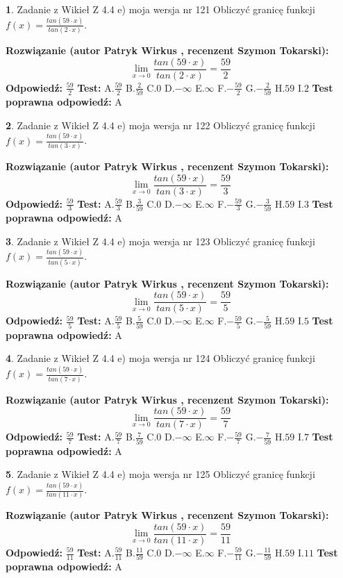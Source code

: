 \documentclass[12pt, a4paper]{article}
\theoremstyle{definition} %
\newtheorem{zad}{}
\newcommand{\zadStart}[1]{\begin{zad}#1\newline}
\newcommand{\zadStop}{\end{zad}}
\newcommand{\rozwStart}[2]{\noindent \textbf{Rozwiązanie (autor #1 , recenzent #2): }\newline}
\newcommand{\rozwStop}{\newline}
\newcommand{\odpStart}{\noindent \textbf{Odpowiedź:}\newline}
\newcommand{\odpStop}{\newline}
\newcommand{\testStart}{\noindent \textbf{Test:}\newline}
\newcommand{\testStop}{\newline}
\newcommand{\kluczStart}{\noindent \textbf{Test poprawna odpowiedź:}\newline}
\newcommand{\kluczStop}{\newline}
\begin{document}
\zadStart{Zadanie z Wikieł Z 4.4 e) moja wersja nr 121}
Obliczyć granicę funkcji $f(x)=\frac{tan(59\cdot x)}{tan(2\cdot x)}$.
\zadStop
\rozwStart{Patryk Wirkus}{Szymon Tokarski}
$$\lim\limits_{x\to 0}\frac{tan(59\cdot x)}{tan(2\cdot x)}=
\frac{59}{2}$$
\rozwStop
\odpStart
$\frac{59}{2}$
\odpStop
\testStart
A.$\frac{59}{2}$
B.$\frac{2}{59}$
C.$0$
D.$-\infty$
E.$\infty$
F.$-\frac{59}{2}$
G.$-\frac{2}{59}$
H.$59$
I.$2$
\testStop
\kluczStart
A
\kluczStop



\zadStart{Zadanie z Wikieł Z 4.4 e) moja wersja nr 122}
Obliczyć granicę funkcji $f(x)=\frac{tan(59\cdot x)}{tan(3\cdot x)}$.
\zadStop
\rozwStart{Patryk Wirkus}{Szymon Tokarski}
$$\lim\limits_{x\to 0}\frac{tan(59\cdot x)}{tan(3\cdot x)}=
\frac{59}{3}$$
\rozwStop
\odpStart
$\frac{59}{3}$
\odpStop
\testStart
A.$\frac{59}{3}$
B.$\frac{3}{59}$
C.$0$
D.$-\infty$
E.$\infty$
F.$-\frac{59}{3}$
G.$-\frac{3}{59}$
H.$59$
I.$3$
\testStop
\kluczStart
A
\kluczStop



\zadStart{Zadanie z Wikieł Z 4.4 e) moja wersja nr 123}
Obliczyć granicę funkcji $f(x)=\frac{tan(59\cdot x)}{tan(5\cdot x)}$.
\zadStop
\rozwStart{Patryk Wirkus}{Szymon Tokarski}
$$\lim\limits_{x\to 0}\frac{tan(59\cdot x)}{tan(5\cdot x)}=
\frac{59}{5}$$
\rozwStop
\odpStart
$\frac{59}{5}$
\odpStop
\testStart
A.$\frac{59}{5}$
B.$\frac{5}{59}$
C.$0$
D.$-\infty$
E.$\infty$
F.$-\frac{59}{5}$
G.$-\frac{5}{59}$
H.$59$
I.$5$
\testStop
\kluczStart
A
\kluczStop



\zadStart{Zadanie z Wikieł Z 4.4 e) moja wersja nr 124}
Obliczyć granicę funkcji $f(x)=\frac{tan(59\cdot x)}{tan(7\cdot x)}$.
\zadStop
\rozwStart{Patryk Wirkus}{Szymon Tokarski}
$$\lim\limits_{x\to 0}\frac{tan(59\cdot x)}{tan(7\cdot x)}=
\frac{59}{7}$$
\rozwStop
\odpStart
$\frac{59}{7}$
\odpStop
\testStart
A.$\frac{59}{7}$
B.$\frac{7}{59}$
C.$0$
D.$-\infty$
E.$\infty$
F.$-\frac{59}{7}$
G.$-\frac{7}{59}$
H.$59$
I.$7$
\testStop
\kluczStart
A
\kluczStop



\zadStart{Zadanie z Wikieł Z 4.4 e) moja wersja nr 125}
Obliczyć granicę funkcji $f(x)=\frac{tan(59\cdot x)}{tan(11\cdot x)}$.
\zadStop
\rozwStart{Patryk Wirkus}{Szymon Tokarski}
$$\lim\limits_{x\to 0}\frac{tan(59\cdot x)}{tan(11\cdot x)}=
\frac{59}{11}$$
\rozwStop
\odpStart
$\frac{59}{11}$
\odpStop
\testStart
A.$\frac{59}{11}$
B.$\frac{11}{59}$
C.$0$
D.$-\infty$
E.$\infty$
F.$-\frac{59}{11}$
G.$-\frac{11}{59}$
H.$59$
I.$11$
\testStop
\kluczStart
A
\kluczStop
\end{document}
